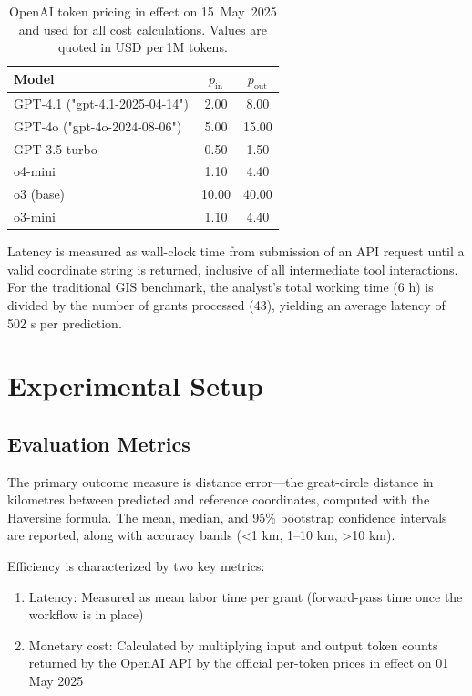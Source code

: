 \begin{table}[H]
\centering
\caption{OpenAI token pricing in effect on 15~May~2025 and used for all cost calculations.  Values are quoted in USD per\,1M tokens.}
\label{tbl:prices}
\begin{tabular}{lcc}
\toprule
Model & $p_{\text{in}}$ & $p_{\text{out}}$ \\
\midrule
GPT-4.1 ("gpt-4.1-2025-04-14") & 2.00 & 8.00 \\
GPT-4o ("gpt-4o-2024-08-06") & 5.00 & 15.00 \\
GPT-3.5-turbo & 0.50 & 1.50 \\
o4-mini & 1.10 & 4.40 \\
o3 (base) & 10.00 & 40.00 \\
o3-mini & 1.10 & 4.40 \\
\bottomrule
\end{tabular}
\end{table}

Latency is measured as wall-clock time from submission of an API request
until a valid coordinate string is returned, inclusive of all
intermediate tool interactions. For the traditional GIS benchmark, the
analyst's total working time (6 h) is divided by the number of grants
processed (43), yielding an average latency of 502 s per prediction.

\section{Experimental Setup}\label{experimental-setup}

\subsection{Evaluation Metrics}\label{evaluation-metrics}

The primary outcome measure is distance error---the great-circle
distance in kilometres between predicted and reference coordinates,
computed with the Haversine formula. The mean, median, and 95\%
bootstrap confidence intervals are reported, along with accuracy bands
(\textless1 km, 1--10 km, \textgreater10 km).

Efficiency is characterized by two key metrics:

\begin{enumerate}
\def\labelenumi{\arabic{enumi}.}
\tightlist
\item
  Latency: Measured as mean labor time per grant (forward-pass time once
  the workflow is in place)
\item
  Monetary cost: Calculated by multiplying input and output token counts
  returned by the OpenAI API by the official per-token prices in effect
  on 01 May 2025
\end{enumerate}

